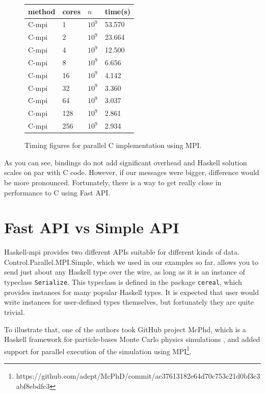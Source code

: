 \documentclass{tmr}
\begin{document}
\begin{figure}
\begin{center}
\begin{tabular}{|l|l|l|l|} \hline
method & cores & $n$ & time(s) \\ \hline\hline
C-mpi & 1   & $10^9$ & 53.570 \\ \hline
C-mpi & 2   & $10^9$ & 23.664  \\ \hline
C-mpi & 4   & $10^9$ & 12.500 \\ \hline
C-mpi & 8   & $10^9$ & 6.656 \\ \hline
C-mpi & 16  & $10^9$ & 4.142 \\ \hline
C-mpi & 32 & $10^9$ & 3.360 \\ \hline
C-mpi & 64   & $10^9$ & 3.037 \\ \hline
C-mpi & 128   & $10^9$ & 2.861 \\ \hline
C-mpi & 256 & $10^9$ & 2.934 \\ \hline
\end{tabular}
\end{center}
\caption{Timing figures for parallel C implementation using MPI.\label{CTiminigTable}}
\end{figure}

As you can see, bindings do not add significant overhead and Haskell
solution scales on par with C code. However, if our messages were
bigger, difference would be more pronounced. Fortunately, there is a
way to get really close in performance to C using Fast API.

\section{Fast API vs Simple API}

Haskell-mpi provides two different APIs suitable for different kinds
of data. Control.Parallel.MPI.Simple, which we used in our examples so
far, allows you to send just about any Haskell type over the wire, as
long as it is an instance of typeclass \verb|Serialize|. This
typeclass is defined in the package \verb|cereal|, which provides
instances for many popular Haskell types. It is expected that user
would write instances for user-defined types themselves, but
fortunately they are quite trivial.

To illustrate that, one of the authors took GitHub project McPhd,
which is a Haskell framework for particle-bases Monte Carlo physics
simulations , and added support for parallel execution of the
simulation using
MPI\footnote{https://github.com/adept/McPhD/commit/ac37613182e64d70c753c21d0bf3c3abf8ebdfc3}.
\end{document}
